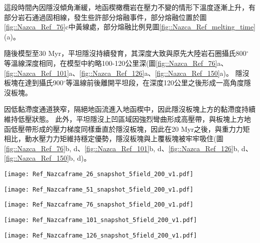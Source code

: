 這段時間內因隱沒傾角漸緩，地函楔橄欖岩在壓力不變的情形下溫度逐漸上升，有部分岩石通過固相線，發生些許部分熔融事件，部分熔融位置於圖\ref{fig::Nazca_Ref_76}c中黃線處，部分熔融比例見圖\ref{fig::Nazca_Ref_melting_time}(a)。

隨後模型至30 Myr，平坦隱沒持續發育，其深度大致與原先大陸岩石圈攝氏800$^{\circ}$等溫線深度相同，在模型中約略100-120公里深(圖\ref{fig::Nazca_Ref_76}a、\ref{fig::Nazca_Ref_101}a、\ref{fig::Nazca_Ref_126}a、\ref{fig::Nazca_Ref_150}a)。
隱沒板塊在達到攝氏900$^{\circ}$等溫線前後離開平坦段，在深度120公里之後形成一高角度隱沒板塊。

因低黏滯度通道狹窄，隔絕地函流進入地函楔中，因此隱沒板塊上方的黏滯度持續維持低壓狀態。
此外，平坦隱沒上凹區域因強烈彎曲形成高壓帶，與板塊上方地函低壓帶形成的壓力梯度同樣垂直於隱沒板塊，因此在20 Myr之後，與重力力矩相比，動水壓力力矩維持穩定優勢，隱沒板塊與上覆板塊被牢牢吸住(圖\ref{fig::Nazca_Ref_76}b, d、\ref{fig::Nazca_Ref_101}b, d、\ref{fig::Nazca_Ref_126}b, d、\ref{fig::Nazca_Ref_150}b, d)。


\begin{figure*}[htp]
    \centering
    \texttt{[image: Ref\_Nazcaframe\_26\_snapshot\_5field\_200\_v1.pdf]}
    \caption[智利參考模型於5 Myr時之結果。]{智利參考模型於5 Myr時之結果。}
    \label{fig::Nazca_Ref_26}
\end{figure*}

\begin{figure*}[htp]
    \centering
    \texttt{[image: Ref\_Nazcaframe\_51\_snapshot\_5field\_200\_v1.pdf]}
    \caption[智利參考模型於10 Myr時之結果。]{智利參考模型於10 Myr時之結果。}
    \label{fig::Nazca_Ref_51}
\end{figure*}

\begin{figure*}[htp]
    \centering
    \texttt{[image: Ref\_Nazcaframe\_76\_snapshot\_5field\_200\_v1.pdf]}
    \caption[智利參考模型於15 Myr時之結果。]{智利參考模型於15 Myr時之結果。}
    \label{fig::Nazca_Ref_76}
\end{figure*}

\begin{figure*}[htp]
    \centering
    \texttt{[image: Ref\_Nazcaframe\_101\_snapshot\_5field\_200\_v1.pdf]}
    \caption[智利參考模型於20 Myr時之結果。]{智利參考模型於20 Myr時之結果。}
    \label{fig::Nazca_Ref_101}
\end{figure*}

\begin{figure*}[htp]
    \centering
    \texttt{[image: Ref\_Nazcaframe\_126\_snapshot\_5field\_200\_v1.pdf]}
    \caption[智利參考模型於25 Myr時之結果。]{智利參考模型於25 Myr時之結果。}
    \label{fig::Nazca_Ref_126}
\end{figure*}


